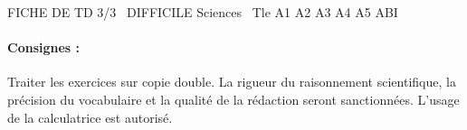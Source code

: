 \documentclass[11pt]{article}
\begin{document}
\begin{tcolorbox}[enhanced,colback=popink,colframe=popink,arc=10pt,boxrule=0pt,left=12pt,right=12pt,top=9pt,bottom=9pt]
{\color{white}\popxbold\small FICHE DE TD 3/3 \textbullet\ DIFFICILE \hfill Sciences \textbullet\ Tle A1 A2 A3 A4 A5 ABI\par}
\end{tcolorbox}
\vspace{4pt}
\paragraph{Consignes :} Traiter les exercices sur copie double. La rigueur du raisonnement scientifique, la précision du vocabulaire et la qualité de la rédaction seront sanctionnées. L'usage de la calculatrice est autorisé.
\end{document}
